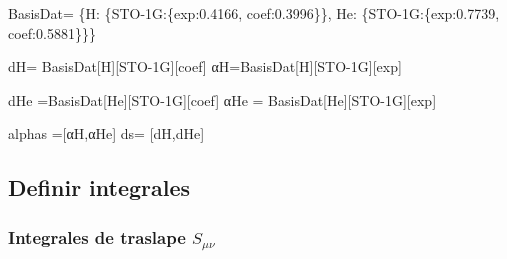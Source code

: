 \documentclass[
  letterpaper,
  DIV=11,
  numbers=noendperiod]{scrreprt}
\newenvironment{Shaded}{\begin{snugshade}}{\end{snugshade}}
\newcommand{\FloatTok}[1]{\textcolor[rgb]{0.68,0.00,0.00}{#1}}
\newcommand{\NormalTok}[1]{\textcolor[rgb]{0.00,0.23,0.31}{#1}}
\newcommand{\OperatorTok}[1]{\textcolor[rgb]{0.37,0.37,0.37}{#1}}
\newcommand{\StringTok}[1]{\textcolor[rgb]{0.13,0.47,0.30}{#1}}
\begin{document}
\begin{Shaded}
\begin{Highlighting}[]
\NormalTok{BasisDat}\OperatorTok{=}\NormalTok{ \{}\StringTok{\textquotesingle{}H\textquotesingle{}}\NormalTok{: \{}\StringTok{\textquotesingle{}STO{-}1G\textquotesingle{}}\NormalTok{:\{}\StringTok{\textquotesingle{}exp\textquotesingle{}}\NormalTok{:}\FloatTok{0.4166}\NormalTok{,}
                           \StringTok{\textquotesingle{}coef\textquotesingle{}}\NormalTok{:}\FloatTok{0.3996}\NormalTok{\}\},               }
          \StringTok{\textquotesingle{}He\textquotesingle{}}\NormalTok{: \{}\StringTok{\textquotesingle{}STO{-}1G\textquotesingle{}}\NormalTok{:\{}\StringTok{\textquotesingle{}exp\textquotesingle{}}\NormalTok{:}\FloatTok{0.7739}\NormalTok{,}
                           \StringTok{\textquotesingle{}coef\textquotesingle{}}\NormalTok{:}\FloatTok{0.5881}\NormalTok{\}\}\}}

\NormalTok{dH}\OperatorTok{=}\NormalTok{ BasisDat[}\StringTok{\textquotesingle{}H\textquotesingle{}}\NormalTok{][}\StringTok{\textquotesingle{}STO{-}1G\textquotesingle{}}\NormalTok{][}\StringTok{\textquotesingle{}coef\textquotesingle{}}\NormalTok{]}
\NormalTok{αH}\OperatorTok{=}\NormalTok{BasisDat[}\StringTok{\textquotesingle{}H\textquotesingle{}}\NormalTok{][}\StringTok{\textquotesingle{}STO{-}1G\textquotesingle{}}\NormalTok{][}\StringTok{\textquotesingle{}exp\textquotesingle{}}\NormalTok{]}

\NormalTok{dHe }\OperatorTok{=}\NormalTok{BasisDat[}\StringTok{\textquotesingle{}He\textquotesingle{}}\NormalTok{][}\StringTok{\textquotesingle{}STO{-}1G\textquotesingle{}}\NormalTok{][}\StringTok{\textquotesingle{}coef\textquotesingle{}}\NormalTok{]}
\NormalTok{αHe }\OperatorTok{=}\NormalTok{ BasisDat[}\StringTok{\textquotesingle{}He\textquotesingle{}}\NormalTok{][}\StringTok{\textquotesingle{}STO{-}1G\textquotesingle{}}\NormalTok{][}\StringTok{\textquotesingle{}exp\textquotesingle{}}\NormalTok{]}

\NormalTok{alphas }\OperatorTok{=}\NormalTok{[αH,αHe]}
\NormalTok{ds}\OperatorTok{=}\NormalTok{ [dH,dHe]}
\end{Highlighting}
\end{Shaded}

\hypertarget{definir-integrales}{%
\subsection{Definir integrales}\label{definir-integrales}}

\hypertarget{integrales-de-traslape-s_mu-nu}{%
\subsubsection{\texorpdfstring{Integrales de traslape
\(S_{\mu \nu}\)}{Integrales de traslape S\_\{\textbackslash mu \textbackslash nu\}}}\label{integrales-de-traslape-s_mu-nu}}
\end{document}
